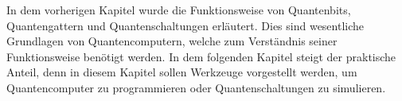 In dem vorherigen Kapitel wurde die Funktionsweise von Quantenbits, Quantengattern und Quantenschaltungen erl\"autert. Dies sind wesentliche Grundlagen von Quantencomputern, welche zum Verst\"andnis seiner Funktionsweise ben\"otigt werden. In dem folgenden Kapitel steigt der praktische Anteil, denn in diesem Kapitel sollen Werkzeuge vorgestellt werden, um Quantencomputer zu programmieren oder Quantenschaltungen zu simulieren.
